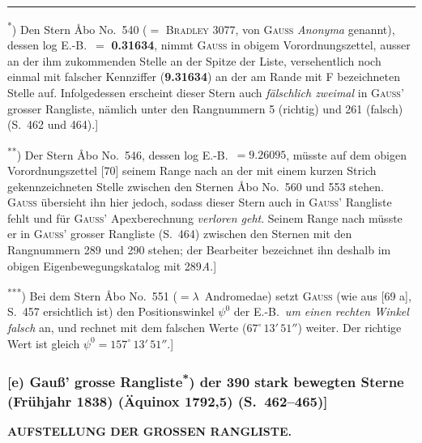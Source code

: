 \documentclass[12pt,a4paper]{article}
\theoremstyle{plain}
\theoremstyle{definition}
\theoremstyle{remark}
\begin{document}
\medskip
\noindent\rule{\textwidth}{0.4pt}
\begin{footnotesize}
\textsuperscript{*}) Den Stern \AA bo No.~540 ($=$ \textsc{Bradley} 3077, von \textsc{Gau\ss} \textit{\glqq Anonyma\grqq}
genannt), dessen log E.-B.~$=$ \textbf{0.31634}, nimmt \textsc{Gau\ss} in obigem
Vorordnungszettel, ausser an der ihm zukommenden Stelle an der Spitze der
Liste, versehentlich noch einmal mit falscher Kennziffer (\textbf{9.31634}) an der
am Rande mit F bezeichneten Stelle auf. Infolgedessen erscheint dieser Stern
auch \textit{f\"alschlich zweimal} in \textsc{Gau\ss'} grosser Rangliste, n\"amlich unter den
Rangnummern 5 (richtig) und 261 (falsch) (S.~462 und 464).]

\textsuperscript{**}) Der Stern \AA bo No.~546, dessen log E.-B.~$= 9.26095$, m\"usste auf dem
obigen Vorordnungszettel [70] seinem Range nach an der mit einem kurzen Strich
gekennzeichneten Stelle zwischen den Sternen \AA bo No.~560 und 553 stehen.
\textsc{Gau\ss} \"ubersieht ihn hier jedoch, sodass dieser Stern auch in \textsc{Gau\ss'}
Rangliste fehlt und f\"ur \textsc{Gau\ss'} Apexberechnung \textit{verloren geht}. Seinem
Range nach m\"usste er in \textsc{Gau\ss'} grosser Rangliste (S.~464) zwischen den
Sternen mit den Rangnummern 289 und 290 stehen; der Bearbeiter bezeichnet
ihn deshalb im obigen Eigenbewegungskatalog mit 289\textit{A}.]

\textsuperscript{***}) Bei dem Stern \AA bo No.~551 ($= \lambda$~Andromedae) setzt \textsc{Gau\ss} (wie aus
[69 a], S.~457 ersichtlich ist) den Positionswinkel $\psi^{0}$ der E.-B.~\textit{um einen
rechten Winkel falsch} an, und rechnet mit dem falschen Werte ($67^{\circ}\,13'\,51''$)
weiter. Der richtige Wert ist gleich $\psi^{0} = 157^{\circ}\,13'\,51''$.]
\end{footnotesize}

\newpage
\subsubsection*{[e) Gau\ss' grosse \glqq Rangliste\grqq\textsuperscript{*}) der 390 stark bewegten Sterne (Fr\"uhjahr 1838) (\"Aquinox 1792,5) (S.~462--465)]}

\begin{center}
\textbf{AUFSTELLUNG DER GROSSEN RANGLISTE.}
\end{center}
\end{document}
